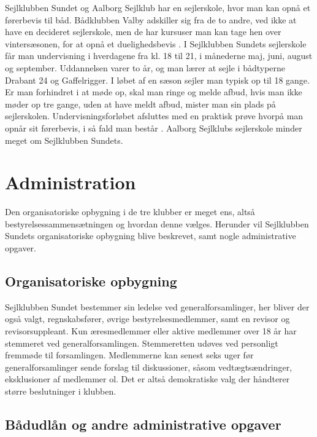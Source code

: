 Sejlklubben Sundet og Aalborg Sejlklub har en sejlerskole, hvor man kan opnå et førerbevis til båd. Bådklubben Valby
adskiller sig fra de to andre, ved ikke at have en decideret sejlerskole, men de har kursuser man kan tage hen over
vintersæsonen, for at opnå et duelighedsbevis \citep{baedklubben_valby_duelighedsbevis}. \newline 
I Sejlklubben Sundets sejlerskole får man undervisning i hverdagene fra kl. 18 til 21, i månederne maj, juni, august og
september. Uddannelsen varer to år, og man lærer at sejle i bådtyperne Drabant 24 og Gaffelrigger. I løbet af en sæson
sejler man typisk op til 18 gange. Er man forhindret i at møde op, skal man ringe og melde afbud, hvis man ikke møder op
tre gange, uden at have meldt afbud, mister man sin plads på sejlerskolen. Undervisningsforløbet afsluttes med en
praktisk prøve hvorpå man opnår sit førerbevis, i så fald man består \citep{Sundet}. Aalborg Sejlklubs sejlerskole
minder meget om Sejlklubben Sundets.


\section{Administration}\label{sec:organisatoriske-opbygning}

Den organisatoriske opbygning i de tre klubber er meget ens, altså bestyrelsessammensætningen og hvordan denne vælges. 
Herunder vil Sejlklubben Sundets organisatoriske opbygning blive beskrevet, samt nogle administrative opgaver.


\subsection{Organisatoriske opbygning}\label{subsec:organisatoriske-opbygning}

Sejlklubben Sundet bestemmer sin ledelse ved generalforsamlinger, her bliver der også valgt, regnskabsfører, øvrige
bestyrelsesmedlemmer, samt en revisor og revisorsuppleant. Kun æresmedlemmer eller aktive medlemmer over 18 år har
stemmeret ved generalforsamlingen. Stemmeretten udøves ved personligt fremmøde til forsamlingen. Medlemmerne kan senest
seks uger før generalforsamlinger sende forslag til diskussioner, såsom vedtægtsændringer, eksklusioner af medlemmer ol.
Det er altså demokratiske valg der håndterer større beslutninger i klubben.


\subsection{Bådudlån og andre administrative opgaver}\label{subsec:bådudlån}


